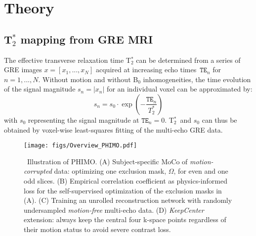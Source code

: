 \documentclass[AMA,STIX2COL]{MRM}
\newcommand{\tstar}[1]{{T$_2^*$}}
\begin{document}
\section{Theory}\label{sec:backgr}
\subsection{\tstar{} mapping from GRE MRI} \label{sec:backgr:t2star_mapping}
The effective transverse relaxation time \tstar{} can be determined from a series of GRE images $x = [x_1, ..., x_N]$ acquired at increasing echo times~$\mathtt{TE}_n$ for $n=1, ..., N$. Without motion and without B$_0$ inhomogeneities, the time evolution of the signal magnitude $s_n = \lvert x_n \rvert$ for an individual voxel can be approximated by:\cite{Magerkurth_2011} 
%
\begin{equation}
    s_n = s_0 \cdot \exp\left(-\frac{\mathtt{TE}_n}{T_2^*}\right)
    \label{eq:decay}
\end{equation}
with $s_0$ representing the signal magnitude at $\mathtt{TE}_n=0$. \tstar{}~and $s_0$ can thus be obtained by voxel-wise least-squares fitting of the multi-echo GRE data.
%

%
\begin{figure*}[t]
\centerline{\texttt{[image: figs/Overview\_PHIMO.pdf]}}
\caption{\ Illustration of PHIMO. (A) Subject-specific MoCo of \textit{motion-corrupted} data: optimizing one exclusion mask, $\Omega$, for even and one odd slices. 
(B) Empirical correlation coefficient as physics-informed loss for the self-supervised optimization of the exclusion masks in (A).
(C) Training an unrolled reconstruction network with randomly undersampled \textit{motion-free} multi-echo data.     
(D) \textit{KeepCenter} extension: always keep the central four k-space points regardless of their motion status to avoid severe contrast loss.
}\label{fig:PHIMO}
\end{figure*}
%
\end{document}
